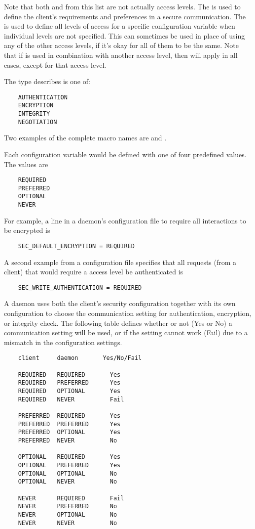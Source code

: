 Note that both  and  
from this list are not actually access levels.
The  is used to define the client's requirements
and preferences in a secure communication.
The  is used to define all levels of access
for a specific configuration variable when individual levels
are not specified. 
This can sometimes be used in place of using any of
the other access levels, if it's okay for all of them to be the same. 
Note that if  is used in combination with another
access level, then  will apply in all cases, except
for that access level. 

The type describes is one of:
\begin{verbatim}
    AUTHENTICATION
    ENCRYPTION
    INTEGRITY
    NEGOTIATION
\end{verbatim}
Two examples of the complete macro names are
and
.

Each configuration variable would be defined with one
of four predefined values.
The values are
\begin{verbatim}
    REQUIRED
    PREFERRED
    OPTIONAL
    NEVER 
\end{verbatim}
For example, a line in a daemon's configuration file
to require all interactions to be encrypted is
\begin{verbatim}
    SEC_DEFAULT_ENCRYPTION = REQUIRED
\end{verbatim}
A second example from a configuration file specifies that all
requests (from a client) that would require a 
access level be authenticated is
\begin{verbatim}
    SEC_WRITE_AUTHENTICATION = REQUIRED
\end{verbatim}

A daemon uses both the client's security configuration
together with its own configuration to choose the communication
setting
for authentication, encryption, or integrity check.
The following table defines whether or not (Yes or No) a
communication setting will be used, or if the setting cannot
work (Fail) due to a mismatch in the configuration settings.

\begin{verbatim}
    client     daemon       Yes/No/Fail

    REQUIRED   REQUIRED       Yes
    REQUIRED   PREFERRED      Yes
    REQUIRED   OPTIONAL       Yes
    REQUIRED   NEVER          Fail

    PREFERRED  REQUIRED       Yes
    PREFERRED  PREFERRED      Yes
    PREFERRED  OPTIONAL       Yes
    PREFERRED  NEVER          No

    OPTIONAL   REQUIRED       Yes
    OPTIONAL   PREFERRED      Yes
    OPTIONAL   OPTIONAL       No
    OPTIONAL   NEVER          No

    NEVER      REQUIRED       Fail
    NEVER      PREFERRED      No
    NEVER      OPTIONAL       No
    NEVER      NEVER          No
\end{verbatim}

